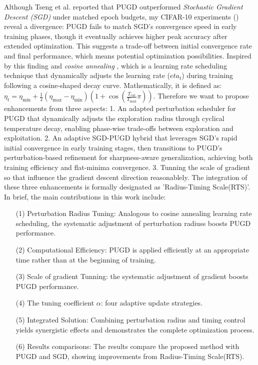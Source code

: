 \documentclass[10pt,twocolumn,letterpaper]{article}
\begin{document}
Although Tseng et al. \cite{Tseng_2022} reported that PUGD outperformed \textit{Stochastic Gradient Descent (SGD)} \cite{4308316} under matched epoch budgets, my CIFAR-10 experiments () reveal a divergence: PUGD fails to match SGD's convergence speed in early training phases, though it eventually achieves higher peak accuracy after extended optimization. This suggests a trade-off between initial convergence rate and final performance, which means potential optimization possibilities.
Inspired by this finding and \textit{cosine annealing} \cite{loshchilov2017sgdrstochasticgradientdescent}, which is a learning rate scheduling technique that dynamically adjusts the learning rate ($eta_t$) during training following a cosine-shaped decay curve. Mathematically, it is defined as: $\eta_t = \eta_{\min} + \frac{1}{2}(\eta_{\max} - \eta_{\min})\left(1 + \cos\left(\frac{T_{\text{cur}}}{T_{\max}}\pi\right)\right)$. Therefore we want to propose enhancements from three aspects: 1. An adapted perturbation scheduler for PUGD that dynamically adjusts the exploration radius through cyclical temperature decay, enabling phase-wise trade-offs between exploration and exploitation. 2. An adaptive SGD-PUGD hybrid that leverages SGD's rapid initial convergence in early training stages, then transitions to PUGD's perturbation-based refinement for sharpness-aware generalization, achieving both training efficiency and flat-minima convergence. 3. Tunning the scale of gradient so that influence the gradient descent direction reasonablely. The integration of these three enhancements is formally designated as 'Radius-Timing Scale(RTS)'.
In brief, the main contributions in this work include: 
\begin{enumerate}
    \item[(1)] Perturbation Radius Tuning: Analogous to cosine annealing learning rate scheduling, the systematic adjustment of perturbation radiuss boosts PUGD performance.
    \item[(2)] Computational Efficiency: PUGD is applied efficiently at an appropriate time rather than at the beginning of training. 
    \item[(3)] Scale of gradient Tunning: the systematic adjustment of gradient boosts PUGD performance.
    \item[(4)] The tuning coefficient $\alpha$: four adaptive update strategies.
    \item[(5)] Integrated Solution: Combining perturbation radius and timing control yields synergistic effects and demonstrates the complete optimization process. 
    \item[(6)] Results comparisons: The results compare the proposed method with PUGD and SGD, showing improvements from Radius-Timing Scale(RTS). 
\end{enumerate}
\end{document}
